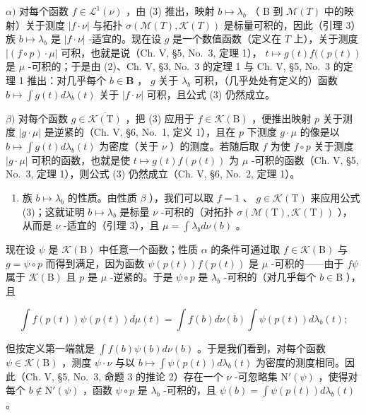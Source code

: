 \(\alpha)\) 对每个函数 \(f \in \mathcal{L}^1(\nu)\) ，由 (3) 推出，映射 \(b \mapsto \lambda_b\) （ B 到 \(\mathcal{M}(T)\) 中的映射）关于测度 \(|f \cdot \nu|\) 与拓扑 \(\sigma(\mathcal{M}(T), \mathcal{K}(T))\) 是标量可积的，因此（引理 3）族 \(b \mapsto \lambda_b\) 是 \(|f \cdot \nu|\) -适宜的。现在设 \(g\) 是一个数值函数（定义在 \(T\) 上），关于测度 \(|(f \circ p) \cdot \mu|\) 可积，也就是说（Ch. V, §5, No.~3, 定理 1）， \(t \mapsto g(t)f((p(t))\) 是 \(\mu\) -可积的；于是由 (2)、Ch. V, §3, No.~3 的定理 1 与 Ch. V, §5, No.~3 的定理 1 推出：对几乎每个 \(b \in \mathbf{B}\) ， \(g\) 关于 \(\lambda_b\) 可积，（几乎处处有定义的）函数 \(b \mapsto \int g(t)d\lambda_b(t)\) 关于 \(|f \cdot \nu|\) 可积，且公式 (3) 仍然成立。

\(\beta)\) 对每个函数 \(g \in \overline{\mathcal{K}(\mathrm{T})}\) ，把 (3) 应用于 \(f \in \mathcal{K}(\mathrm{B})\) ，便推出映射 \(p\) 关于测度 \(|g \cdot \mu|\) 是逆紧的（Ch. V, §6, No.~1, 定义 1），且在 \(p\) 下测度 \(g \cdot \mu\) 的像是以 \(b \mapsto \int g(t) d\lambda_b(t)\) 为密度（关于 \(\nu\) ）的测度。若随后取 \(f\) 为使 \(f \circ p\) 关于测度 \(|g \cdot \mu|\) 可积的函数，也就是使 \(t \mapsto g(t)f(p(t))\) 为 \(\mu\) -可积的函数（Ch. V, §5, No.~3, 定理 1），则公式 (3) 仍然成立（Ch. V, §6, No.~2, 定理 1）。

\begin{enumerate}
\def\labelenumi{\arabic{enumi})}
\setcounter{enumi}{3}
\tightlist
\item
  族 \(b \mapsto \lambda_b\) 的性质。由性质 \(\beta\) ），我们可以取 \(f = 1\) 、 \(g \in \mathcal{K}(\mathrm{T})\) 来应用公式 (3)；这就证明 \(b \mapsto \lambda_b\) 是标量 \(\nu\) -可积的（对拓扑 \(\sigma(\mathcal{M}(\mathrm{T}), \mathcal{K}(\mathrm{T}))\) ），从而是 \(\nu\) -适宜的（引理 3），且 \(\mu = \int \lambda_b d\nu(b)\) 。
\end{enumerate}

现在设 \(\psi\) 是 \(\mathcal{K}(\mathrm{B})\) 中任意一个函数；性质 \(\alpha\) 的条件可通过取 \(f \in \mathcal{K}(\mathrm{B})\) 与 \(g = \psi \circ p\) 而得到满足，因为函数 \(\psi(p(t))f(p(t))\) 是 \(\mu\) -可积的——由于 \(f\psi\) 属于 \(\mathcal{K}(\mathrm{B})\) 且 \(p\) 是 \(\mu\) -逆紧的。于是 \(\psi \circ p\) 是 \(\lambda_b\) -可积的（对几乎每个 \(b \in \mathrm{B}\) ），且

\[
\int f (p (t)) \psi (p (t)) d \mu (t) = \int f (b) d \nu (b) \int \psi (p (t)) d \lambda_ {b} (t);
\]

但按定义第一端就是 \(\int f(b)\psi (b)d\nu (b)\) 。于是我们看到，对每个函数 \(\psi \in \mathcal{K}(\mathrm{B})\) ，测度 \(\psi \cdot \nu\) 与以 \(b\mapsto \int \psi (p(t))d\lambda_b(t)\) 为密度的测度相同。因此（Ch. V, §5, No.~3, 命题 3 的推论 2）存在一个 \(\nu\) -可忽略集 \(\mathrm{N}'(\psi)\) ，使得对每个 \(b\notin \mathrm{N}'(\psi)\) ，函数 \(\psi \circ p\) 是 \(\lambda_{b}\) -可积的，且 \(\psi (b) = \int \psi (p(t))d\lambda_b(t)\) 。

